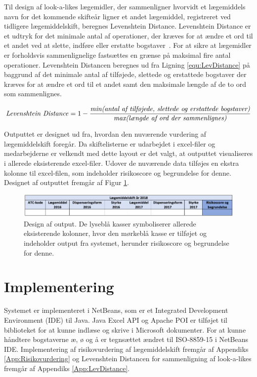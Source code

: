 Til design af look-a-likes lægemidler, der sammenligner hvorvidt et lægemiddels navn for det kommende skifteår ligner et andet lægemiddel, registreret ved tidligere lægemiddelskift, beregnes Levenshtein Distance. Levenshtein Distance er et udtryk for det minimale antal af operationer, der kræves for at ændre et ord til et andet ved at slette, indføre eller erstatte bogstaver~\citep{Schepens2012}. For at sikre at lægemidler er forholdsvis sammenlignelige fastsættes en grænse på maksimal fire antal operationer. Levenshtein Distancen beregnes ud fra Ligning \ref{equ:LevDistance} på baggrund af det minimale antal af tilføjede, slettede og erstattede bogstaver der kræves for at ændre et ord til et andet samt den maksimale længde af de to ord som sammenlignes. 

\begin{equation} \label{equ:LevDistance}
\mbox{\textit{Levenshtein Distance}} = 1 - \frac{\mbox{\textit{min(antal af tilføjede, slettede og erstattede bogstaver)}}}{\mbox{\textit{max(længde af ord der sammenlignes)}}}   
\end{equation}

Outputtet er designet ud fra, hvordan den nuværende vurdering af lægemiddelskift foregår. Da skiftelisterne er udarbejdet i excel-filer og medarbejderne er velkendt med dette layout er det valgt, at outputtet visualiseres i allerede eksisterende excel-filer. Udover de nuværende data tilføjes en ekstra kolonne til excel-filen, som indeholder risikoscore og begrundelse for denne. Designet af outputtet fremgår af Figur \ref{fig:Output}.

\vspace{0.2cm}
\begin{figure}[H]\centering
\includegraphics[width=1\textwidth]{billeder/Output.png} 
	\caption{Design af output. De lyseblå kasser symboliserer allerede eksisterende kolonner, hvor den mørkeblå kasse er tilføjet og indeholder output fra systemet, herunder risikoscore og begrundelse for denne.}
	\label{fig:Output}  
\end{figure}

\section{Implementering}
Systemet er implementeret i NetBeans, som er et Integrated Development Environment (IDE) til Java.  Java Excel API og Apache POI er tilføjet til biblioteket for at kunne indlæse og skrive i Microsoft dokumenter. For at kunne håndtere bogstaverne æ, ø og å er tegnsættet ændret til ISO-8859-15 i NetBeans IDE. Implementering af risikovurdering af lægemiddelskift fremgår af Appendiks \ref{App:Risikovurdering} og Levenshtein Distancen for sammenligning af look-a-likes fremgår af Appendiks \ref{App:LevDistance}.

